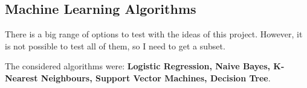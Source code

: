 \documentclass{article}
\begin{document}

    \subsection{Machine Learning Algorithms}
    There is a big range of options to test with the ideas of this project.
    However, it is not possible to test all of them, so I need to get a subset.

    The considered algorithms were: \textbf{Logistic Regression, Naive Bayes,
    K-Nearest Neighbours, Support Vector Machines, Decision Tree}.
\end{document}

